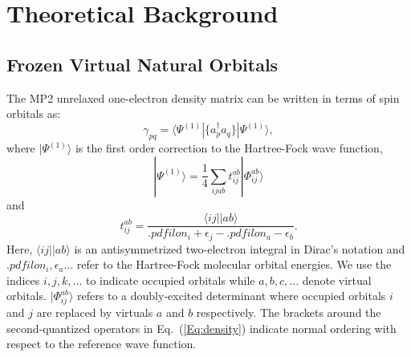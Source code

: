 \section{Theoretical Background}

\subsection{Frozen Virtual Natural Orbitals}

The MP2 unrelaxed one-electron density matrix can be written in terms of
spin orbitals as: 
\begin{equation}
\gamma_{pq} = \langle \Psi^{(1)}|\{ a^{\dagger}_{p}a_q\}|\Psi^{(1)}\rangle,
\label{Eq:density}
\end{equation}
where $|\Psi^{(1)}\rangle$ is the first order correction to the Hartree-Fock
wave function,
\begin{equation}
|\Psi^{(1)}\rangle = \frac{1}{4}\sum_{ijab} t^{ab}_{ij}|\Phi^{ab}_{ij}\rangle
\end{equation}
and
\begin{equation}
t^{ab}_{ij} = \frac{\langle ij||ab\rangle}{.pdfilon_i + \epsilon_j -
.pdfilon_a - \epsilon_b}.
\end{equation}
Here, $\langle ij||ab\rangle$ is an antisymmetrized two-electron integral in
Dirac's notation and $.pdfilon_i,\epsilon_a...$ refer to the Hartree-Fock
molecular orbital energies. We use the indices $i,j,k,...$ to indicate occupied
orbitals while $a,b,c,...$ denote virtual orbitals. $|\Phi^{ab}_{ij}\rangle$
refers to a doubly-excited determinant where occupied orbitals $i$ and $j$ are
replaced by virtuals $a$ and $b$ respectively.  The brackets around the
second-quantized operators in Eq.~(\ref{Eq:density}) indicate normal ordering
with respect to the reference wave function.


